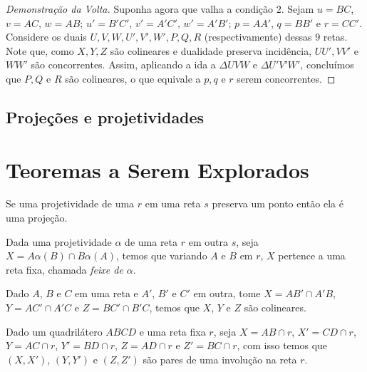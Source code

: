 \begin{proof}[Demonstração da Volta]
Suponha agora que valha a condição $2$.
Sejam \(u = BC\), \(v = AC\), \(w = AB\); \(u' = B'C'\), \(v' = A'C'\), \(w' = A'B'\); \(p = AA'\), \(q = BB'\) e \(r = CC'\). Considere os duais $U,V,W,U',V',W',P,Q,R$ (respectivamente) dessas $9$ retas. Note que, como $X,Y,Z$ são colineares e dualidade preserva incidência, $UU', VV'$ e $WW'$ são concorrentes. Assim, aplicando a ida a $\Delta UVW$ e $\Delta U'V'W'$, concluímos que $P,Q$ e $R$ são colineares, o que equivale a $p,q$ e $r$ serem concorrentes.
\end{proof}

\subsection{Projeções e projetividades}

\newpage
\section{Teoremas a Serem Explorados}
\begin{lem}
Se uma projetividade de uma $r$ em uma reta $s$ preserva um ponto então ela é uma projeção.
\end{lem}

\begin{thm}
Dada uma projetividade $\alpha$ de uma reta $r$ em outra $s$, seja $X = A\alpha(B) \cap B\alpha(A)$, temos que variando $A$ e $B$ em $r$, $X$ pertence a uma reta fixa, chamada \emph{feixe de $\alpha$}.
\end{thm}

\begin{cor}
Dado $A$, $B$ e $C$ em uma reta e $A'$, $B'$ e $C'$ em outra, tome $X = AB' \cap A'B$, $Y = AC'\cap A'C$ e $Z = BC' \cap B'C$, temos que $X$, $Y$ e $Z$ são colineares.
\end{cor}


\begin{thm}
Dado um quadrilátero $ABCD$ e uma reta fixa $r$, seja $X = AB \cap r$, $X' = CD \cap r$, $Y = AC \cap r$, $Y' = BD \cap r$, $Z = AD \cap r$ e $Z' = BC \cap r$, com isso temos que $(X,X')$, $(Y,Y')$ e $(Z,Z')$ são pares de uma involução na reta $r$.
    
\end{thm}
